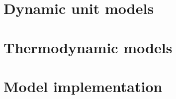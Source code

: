     \section{Dynamic unit models}
    \label{sec:mathpro:dynamic}
        

    \section{Thermodynamic models}
    \label{sec:mathpro:thermo}
        

    \section{Model implementation}
    \label{sec:mathpro:implementation}
        
